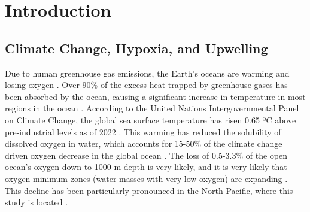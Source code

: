 \documentclass[12pt,twoside]{reedthesis}
\begin{document}
	

  \mainmatter %
  \pagestyle{fancyplain} %


    \chapter*{Introduction}

	

\section{Climate Change, Hypoxia, and Upwelling}

Due to human greenhouse gas emissions, the Earth's oceans are warming and losing oxygen \autocite{Portner2022, Ito2017}. Over 90\% of the excess heat trapped by greenhouse gases has been absorbed by the ocean, causing a significant increase in temperature in most regions in the ocean \autocite{Bindoff2013}. According to the United Nations Intergovernmental Panel on Climate Change, the global sea surface temperature has risen 0.65 ºC above pre-industrial levels as of 2022 \autocite{Portner2022}. This warming has reduced the solubility of dissolved oxygen in water, which accounts for 15-50\% of the climate change driven oxygen decrease in the global ocean \autocite{Helm2011, Ito2017, Schmidtko2017}. The loss of 0.5-3.3\% of the open ocean's oxygen down to 1000 m depth is very likely, and it is very likely that oxygen minimum zones (water masses with very low oxygen) are expanding \autocite{Bindoff2013}. This decline has been particularly pronounced in the North Pacific, where this study is located \autocite{Bindoff2013, Ito2017}.
\end{document}
